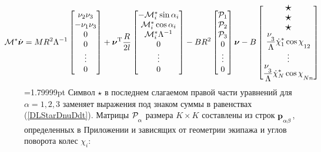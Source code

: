 \begin{eqnarray*}
    \hspace{-25pt}
    \M^*\dot{\vnu} = 
    MR^2\Lambda^{-1}\begin{bmatrix}
        \nu_2\nu_3\\
        -\nu_1\nu_3\\
        0\\
        0\\
        \vdots
        \\
        0
    \end{bmatrix}
    +\vnu^\mathrm{T}
    \frac{R}{2l}
    \begin{bmatrix}
        -\M^*_i \sin\alpha_i\\
        \M^*_i \cos\alpha_i\\
        \M^*_i \Lambda^{-1}\\
        0\\
        \vdots
        \\
        0
    \end{bmatrix}
    -BR^2
    \begin{bmatrix}
        \Prhs_1\\
        \Prhs_2\\
        \Prhs_3\\
        0\\
        \vdots
        \\
        0
    \end{bmatrix}
    \vnu
    -B\begin{bmatrix}
        \scalebox{1.5}{$\star$}\\
        \scalebox{1.5}{$\star$}\\
        \scalebox{1.5}{$\star$}\\
        \fontdimen16\textfont2=5pt
        \ddfrac{\nu_3}{\Lambda}\dot{\chi}_1^*\cos\chi_{12}\\
        \vdots
        \\
        \ddfrac{\nu_3}{\Lambda}\dot{\chi}_N^*\cos\chi_{Nn}
    \end{bmatrix}
\end{eqnarray*}
\begin{equation}\label{eq:full_system}
\end{equation}
=1.79999pt
Символ $\star$ в последнем слагаемом правой части уравнений для $\alpha = 1,2,3 $ заменяет выражения под знаком суммы в равенствах (\ref{DLStarDnuDdt}). Матрицы $\Prhs_\alpha$ размера $K\times K$ составлены из строк $\prhs_{\alpha\beta}$, определенных в Приложении и зависящих от геометрии экипажа и углов поворота колес $\chi_i$:
